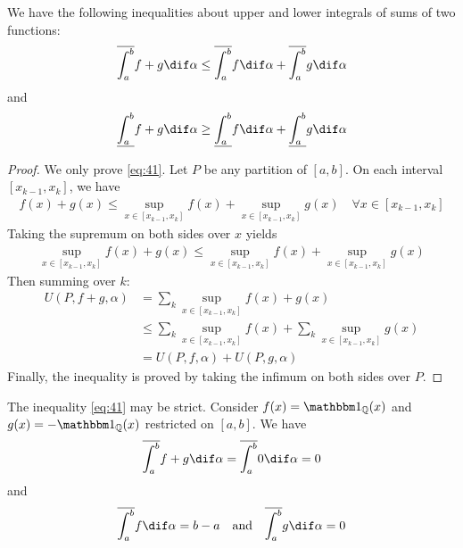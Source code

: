 \documentclass[thmcnt=section, color=blue, 12pt]{my-elegantbook}
\begin{document}
\begin{proposition}
	We have the following inequalities
	about upper and lower integrals of sums of two functions:
	\begin{align}
		\overline{\int_a^b} f+g \dif \alpha
		\leq \overline{\int_a^b} f \dif \alpha
		+ \overline{\int_a^b} g \dif \alpha
		\label{eq:41}
	\end{align}
	and
	\begin{align*}
		\underline{\int_a^b} f+g \dif \alpha
		\geq \underline{\int_a^b} f \dif \alpha
		+ \underline{\int_a^b} g \dif \alpha
	\end{align*}
\end{proposition}

\begin{proof}
	We only prove \eqref{eq:41}.
	Let $P$ be any partition of $[a, b]$.
	On each interval $[x_{k-1}, x_k]$, we have
	\begin{align*}
		f(x) + g(x)
		\leq \sup_{x \in [x_{k-1}, x_k]} f(x)
		+ \sup_{x \in [x_{k-1}, x_k]} g(x)
		\quad \forall x \in [x_{k-1}, x_k]
	\end{align*}
	Taking the supremum on both sides over $x$ yields
	\begin{align*}
		\sup_{x \in [x_{k-1}, x_k]} f(x) + g(x)
		\leq \sup_{x \in [x_{k-1}, x_k]} f(x)
		+ \sup_{x \in [x_{k-1}, x_k]} g(x)
	\end{align*}
	Then summing over $k$:
	\begin{align*}
		U(P, f+g, \alpha)
		 & = \sum_{k} \sup_{x \in [x_{k-1}, x_k]} f(x) + g(x) \\
		 & \leq \sum_{k} \sup_{x \in [x_{k-1}, x_k]} f(x)
		+ \sum_{k} \sup_{x \in [x_{k-1}, x_k]} g(x)           \\
		 & = U(P, f, \alpha) + U(P, g, \alpha)
	\end{align*}
	Finally, the inequality is proved by
	taking the infimum on both sides over $P$.
\end{proof}

\begin{example}
	The inequality \eqref{eq:41} may be strict.
	Consider $f(x) = \ind_{\Q} (x)$ and $g(x) = -\ind_{\Q}(x)$
	restricted on $[a, b]$.
	We have
	\begin{align*}
		\overline{\int_a^b} f+g \dif \alpha
		= \overline{\int_a^b} 0 \dif \alpha
		= 0
	\end{align*}
	and
	\begin{align*}
		\overline{\int_a^b} f \dif \alpha = b-a
		\quad \text{and} \quad
		\overline{\int_a^b} g \dif \alpha = 0
	\end{align*}
\end{example}
\end{document}
